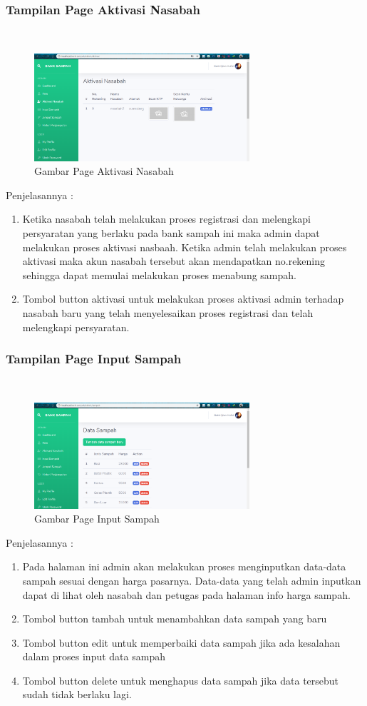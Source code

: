 \subsubsection{Tampilan Page Aktivasi Nasabah}
\hfill\\
	\begin{figure}[H]
		\includegraphics[width=8cm]{figures/analisis/21.png}
		\centering
		\caption{Gambar Page Aktivasi Nasabah}
	\end{figure}
Penjelasannya :
\begin{enumerate}
\item Ketika nasabah telah melakukan proses registrasi dan melengkapi persyaratan yang berlaku pada bank sampah ini maka admin dapat melakukan proses aktivasi nasbaah. Ketika admin telah melakukan proses aktivasi maka akun nasabah tersebut akan mendapatkan no.rekening sehingga dapat memulai melakukan proses menabung sampah. 
\item Tombol button aktivasi untuk melakukan proses aktivasi admin terhadap nasabah baru yang telah menyelesaikan proses registrasi dan telah melengkapi persyaratan.
\end{enumerate}
	
\subsubsection{Tampilan Page Input Sampah}
\hfill\\
	\begin{figure}[H]
		\includegraphics[width=8cm]{figures/analisis/22.png}
		\centering
		\caption{Gambar Page Input Sampah}
	\end{figure}
Penjelasannya :
\begin{enumerate}
\item Pada halaman ini admin akan melakukan proses menginputkan data-data sampah sesuai dengan harga pasarnya. Data-data yang telah admin inputkan dapat di lihat oleh nasabah dan petugas pada halaman info harga sampah. 
\item Tombol button tambah untuk menambahkan data sampah yang baru
\item Tombol button edit untuk memperbaiki data sampah jika ada kesalahan dalam proses input data sampah
\item Tombol button delete untuk menghapus data sampah jika data tersebut sudah tidak berlaku lagi.
\end{enumerate}
	

